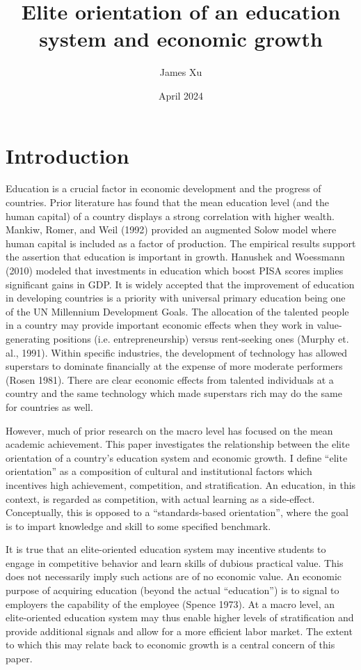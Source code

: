 \documentclass[11pt]{article}
\title{Elite orientation of an education system and economic growth}
\author{James Xu}
\date{April 2024}
\begin{document}
\maketitle

\section{Introduction}
Education is a crucial factor in economic development and the progress of countries. Prior literature has found that the mean education level (and the human capital) of a country displays a strong correlation with higher wealth. Mankiw, Romer, and Weil (1992) provided an augmented Solow model where human capital is included as a factor of production. The empirical results support the assertion that education is important in growth. Hanushek and Woessmann (2010) modeled that investments in education which boost PISA scores implies significant gains in GDP. It is widely accepted that the improvement of education in developing countries is a priority with universal primary education being one of the UN Millennium Development Goals.
The allocation of the talented people in a country may provide important economic effects when they work in value-generating positions (i.e. entrepreneurship) versus rent-seeking ones (Murphy et. al., 1991). Within specific industries, the development of technology has allowed superstars to dominate financially at the expense of more moderate performers (Rosen 1981). There are clear economic effects from talented individuals at a country and the same technology which made superstars rich may do the same for countries as well.

However, much of prior research on the macro level has focused on the mean academic achievement. This paper investigates the relationship between the elite orientation of a country’s education system and economic growth. I define “elite orientation” as a composition of cultural and institutional factors which incentives high achievement, competition, and stratification. An education, in this context, is regarded as competition, with actual learning as a side-effect. Conceptually, this is opposed to a “standards-based orientation”, where the goal is to impart knowledge and skill to some specified benchmark.

It is true that an elite-oriented education system may incentive students to engage in competitive behavior and learn skills of dubious practical value. This does not necessarily imply such actions are of no economic value. An economic purpose of acquiring education (beyond the actual “education”) is to signal to employers the capability of the employee (Spence 1973). At a macro level, an elite-oriented education system may thus enable higher levels of stratification and provide additional signals and allow for a more efficient labor market. The extent to which this may relate back to economic growth is a central concern of this paper.
\end{document}
